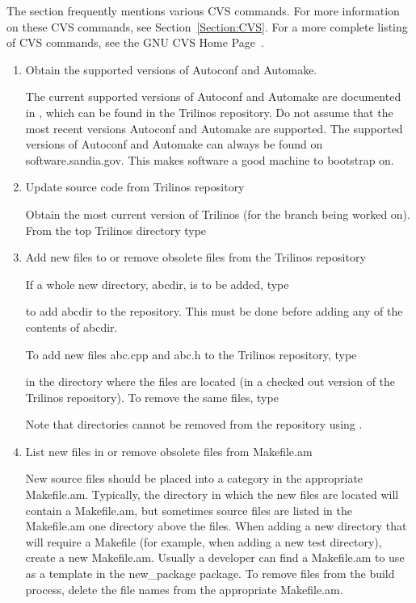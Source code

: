 \documentclass[12pt,relax]{TrilinosDevGuide}
\begin{document}
The section frequently mentions various CVS commands.  For more information on 
these CVS commands, see Section~\ref{Section:CVS}.   For a 
more complete listing of CVS commands, see the GNU CVS Home Page~\cite{CVS}.
 
\begin{enumerate}
\item Obtain the supported versions of Autoconf and Automake.

The current supported versions of Autoconf and Automake are documented in   
, which can be found in 
the Trilinos repository.  Do not assume that the most recent versions Autoconf 
and Automake are supported.  The supported versions of Autoconf and 
Automake can always be found on software.sandia.gov.  This makes software a 
good machine to bootstrap on.

\item Update source code from Trilinos repository

Obtain the most current version of Trilinos (for the branch being worked on).  
From the top Trilinos directory type


\item Add new files to or remove obsolete files from the Trilinos repository

If a whole new directory, abcdir, is to be added, type 


to add abcdir to the repository.  This must be done before adding any of the 
contents of abcdir.

To add new files abc.cpp and abc.h to the Trilinos repository, type


in the directory where the files are located (in a checked out version of the 
Trilinos repository).  To remove the same files, type


Note that directories cannot be removed from the repository using 
.

 \item List new files in or remove obsolete files from Makefile.am

New source files should be placed into a category in the appropriate 
Makefile.am.  Typically, the directory in which the new files are located will 
contain a Makefile.am, but sometimes source files are listed in the 
Makefile.am one directory above the files.  When adding a new directory that 
will require a Makefile (for example, when adding a new test directory), 
create a new Makefile.am.  Usually a developer can find a Makefile.am to use 
as a template in the new\_package package.  To remove files from the build 
process, delete the file names from the appropriate Makefile.am.


\end{enumerate}
\end{document}
